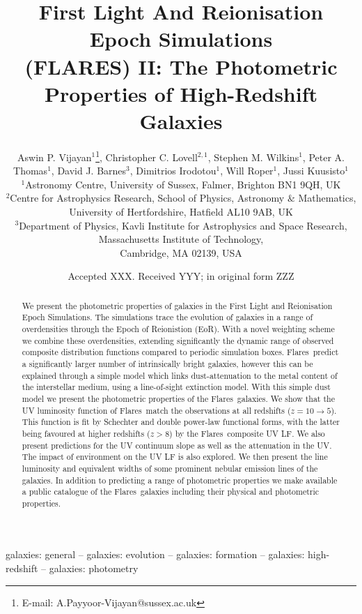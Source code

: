 \documentclass[fleqn,usenatbib]{mnras}
\title[FLARES II]{First Light And Reionisation Epoch Simulations \\(FLARES) II: The Photometric Properties of High-Redshift Galaxies}
\author[Vijayan et al.]{Aswin P. Vijayan$^{1}$\thanks{E-mail: A.Payyoor-Vijayan@sussex.ac.uk},
Christopher C. Lovell$^{2,1}$,
Stephen M. Wilkins$^{1}$,
Peter A. Thomas$^{1}$,
\newauthor
David J. Barnes$^{3}$, 
Dimitrios Irodotou$^{1}$, 
Will Roper$^{1}$, 
Jussi Kuusisto$^{1}$ 
\\
$^{1}$Astronomy Centre, University of Sussex, Falmer, Brighton BN1 9QH, UK\\
$^{2}$Centre for Astrophysics Research, School of Physics, Astronomy $\&$ Mathematics, \\University of Hertfordshire, Hatfield AL10 9AB, UK\\
$^{3}$Department of Physics, Kavli Institute for Astrophysics and Space Research, Massachusetts Institute of Technology,\\Cambridge, MA 02139, USA
}
\date{Accepted XXX. Received YYY; in original form ZZZ}
\newcommand{\flares}{\mbox{\sc Flares}}
\begin{document}
\label{firstpage}
\pagerange{\pageref{firstpage}--\pageref{lastpage}}
\maketitle

\begin{abstract}
We present the photometric properties of galaxies in the First Light and Reionisation Epoch Simulations. The simulations trace the evolution of galaxies in a range of overdensities through the Epoch of Reionistion (EoR). With a novel weighting scheme we combine these overdensities, extending significantly the dynamic range of observed composite distribution functions compared to periodic simulation boxes. \flares\, predict a significantly larger number of intrinsically bright galaxies, however this can be explained through a simple model which links dust-attenuation to the metal content of the interstellar medium, using a line-of-sight extinction model. With this simple dust model we present the photometric properties of the \flares\, galaxies. We show that the UV luminosity function of \flares\, match the observations at all redshifts ($z=10\to5$). This function is fit by Schechter and double power-law functional forms, with the latter being favoured at higher redshifts ($z>8$) by the \flares\, composite UV LF. We also present predictions for the UV continuum slope as well as the attenuation in the UV. The impact of environment on the UV LF is also explored. We then present the line luminosity and equivalent widths of some prominent nebular emission lines of the galaxies. In addition to predicting a range of photometric properties we make available a public catalogue of the \flares\, galaxies including their physical and photometric properties. 
\end{abstract}

\begin{keywords}
galaxies: general -- galaxies: evolution -- galaxies: formation -- galaxies: high-redshift -- galaxies: photometry 
\end{keywords}






%


    
\end{document}
